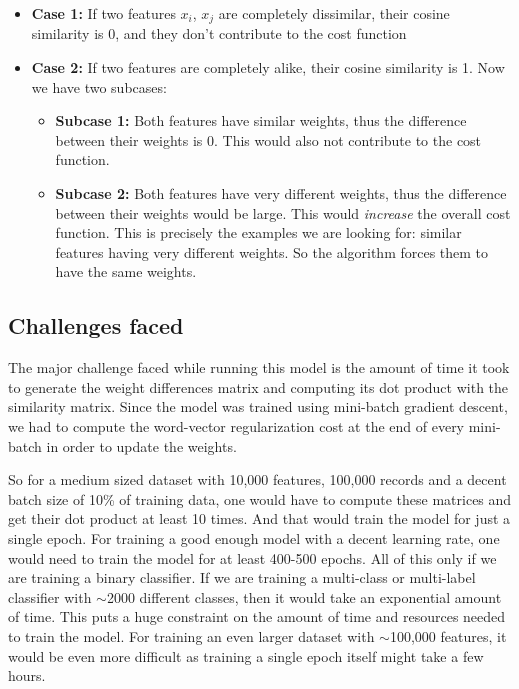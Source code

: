 \begin{itemize}
    \item \textbf{Case 1:} If two features $x_{i}$, $x_{j}$ are completely dissimilar, their cosine similarity is 0, and they don't contribute to the cost function
    \item \textbf{Case 2:} If two features are completely alike, their cosine similarity is 1. Now we have two subcases:
    \begin{itemize}
        \item \textbf{Subcase 1:} Both features have similar weights, thus the difference between their weights is 0. This would also not contribute to the cost function.
        
        \item \textbf{Subcase 2:} Both features have very different weights, thus the difference between their weights would be large. This would \textit{increase} the overall cost function. This is precisely the examples we are looking for: similar features having very different weights. So the algorithm forces them to have the same weights.
    \end{itemize}
\end{itemize}

\subsection{Challenges faced}

The major challenge faced while running this model is the amount of time it took to generate the weight differences matrix and computing its dot product with the similarity matrix. Since the model was trained using mini-batch gradient descent, we had to compute the word-vector regularization cost at the end of every mini-batch in order to update the weights. 

So for a medium sized dataset with 10,000 features, 100,000 records and a decent batch size of 10\% of training data, one would have to compute these matrices and get their dot product at least 10 times. And that would train the model for just a single epoch. For training a good enough model with a decent learning rate, one would need to train the model for at least 400-500 epochs. All of this only if we are training a binary classifier. If we are training a multi-class or multi-label classifier with $\sim$2000 different classes, then it would take an exponential amount of time. This puts a huge constraint on the amount of time and resources needed to train the model. For training an even larger dataset with $\sim$100,000 features, it would be even more difficult as training a single epoch itself might take a few hours.

